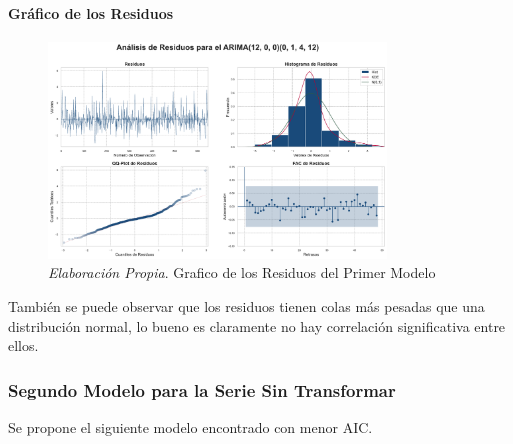 \documentclass[12pt,letterpaper]{article}   %
\begin{document}
\paragraph{Gráfico de los Residuos}
\begin{figure}[ht]
    \centering
    \includegraphics[width=0.8\textwidth]{imagenes/04-01-analisis-de-residuos-m1.pdf}
    \caption{\textit{Elaboración Propia}. Grafico de los Residuos del Primer Modelo}
\end{figure}

También se puede observar que los residuos tienen colas más pesadas que una distribución normal, lo bueno es claramente no hay correlación significativa entre ellos. 




\newpage


\subsubsection{Segundo Modelo para la Serie Sin Transformar}
Se propone el siguiente modelo encontrado con menor AIC.
\end{document}
